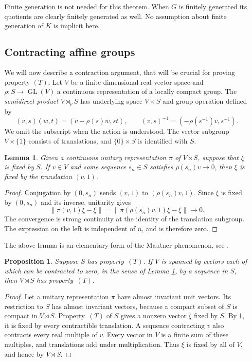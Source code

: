 \documentclass[11pt,a4paper]{article}
\newtheorem{proposition}[theorem]{Proposition}
\newtheorem{lemma}[theorem]{Lemma}
\theoremstyle{definition}
\newcommand{\GL}{\operatorname{GL}}
\newcommand{\rt}{(T)}
\begin{document}
Finite generation is not needed for this theorem. When \(G\)
is finitely generated its quotients are clearly finitely
generated as well. No  assumption about finite generation of \(K\)
is implicit here.

\subsection{Contracting affine groups}
\label{sec:generalaffine}

We will now describe a contraction argument, that will be crucial for proving property \(\rt\).
Let \(V\) be a finite-dimensional real vector space and
\(\rho:S\to\GL(V)\) a continuous representation of a
locally compact group. The \emph{semidirect product}
\(V\rtimes_\rho S\) has underlying space \(V\times S\) and group operation defined by
\[
 (v,s)(w,t)=(v+\rho(s)w,st),\qquad
 (v,s)^{-1}=(-\rho(s^{-1})v,s^{-1}).
\]
We omit the subscript when the action is understood. The vector
subgroup \(V\times\{1\}\) consists of translations, and
\(\{0\}\times S\) is identified with \(S\).

\begin{lemma}
\label{lem:contraction}
Given a continuous unitary representation \(\pi\) of
\(V\rtimes S\), suppose that \(\xi\) is fixed by \(S\).
If \(v\in V\) and some sequence \(s_n\in S\) satisfies
\(\rho(s_n)v\to0\), then \(\xi\) is fixed by the
translation \((v,1)\).
\end{lemma}
\begin{proof}
Conjugation by \((0,s_n)\) sends \((v,1)\) to
\((\rho(s_n)v,1)\). Since \(\xi\) is fixed by
\((0,s_n)\) and its inverse, unitarity gives
\[
 \|\pi(v,1)\xi-\xi\|
 =\|\pi(\rho(s_n)v,1)\xi-\xi\|\longrightarrow0.
\]
The convergence is strong continuity at the identity of the
translation subgroup. The expression on the left is independent
of \(n\), and is therefore zero.
\end{proof}

The above lemma is an elementary form of the Mautner phenomenon,
see \cite[Lemma~1.4.8]{BHV}.

\begin{proposition}
\label{prop:affineT}
Suppose \(S\) has property~\(\rt\). If \(V\) is spanned
by vectors each of which can be contracted to zero, in the sense of Lemma \ref{lem:contraction}, by a sequence
in \(S\), then \(V\rtimes S\) has property~\(\rt\).
\end{proposition}
\begin{proof}
Let a unitary representation \(\pi\) have almost invariant unit vectors. Its restriction
to \(S\) has almost invariant vectors, because a compact subset
of \(S\) is compact in \(V\rtimes S\). Property~\(\rt\)
of \(S\) gives a nonzero vector \(\xi\) fixed by \(S\).
By \cref{lem:contraction}, it is fixed by every contractible
translation. A sequence contracting \(v\) also contracts every
real multiple of \(v\). Every vector in \(V\) is a finite
sum of these multiples, and translations add under multiplication.
Thus \(\xi\) is fixed by all of \(V\), and hence by
\(V\rtimes S\).
\end{proof}
\end{document}
